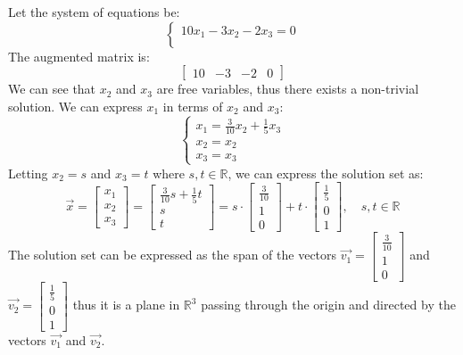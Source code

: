 \begin{eg}
    Let the system of equations be:
    \[
        \begin{cases}
            10x_1 - 3x_2 - 2x_3 = 0 \\
        \end{cases}
    \]
    The augmented matrix is:
    \[
        \begin{bmatrix}
            10 & -3 & -2 & 0
        \end{bmatrix}
    \]
    We can see that $x_2$ and $x_3$ are free variables, thus there exists a non-trivial solution. We can express $x_1$ in terms of $x_2$ and $x_3$:
    \[
        \begin{cases}
            x_1 = \frac{3}{10}x_2 + \frac{1}{5}x_3 \\
            x_2 = x_2 \\
            x_3 = x_3
        \end{cases}
    \]
    Letting $x_2 = s$ and $x_3 = t$ where $s, t \in \mathbb{R}$, we can express the solution set as:
    \[
        \vec{x} = \begin{bmatrix} x_1 \\ x_2 \\ x_3 \end{bmatrix} = \begin{bmatrix} \frac{3}{10}s + \frac{1}{5}t \\ s \\ t \end{bmatrix} = s \cdot \begin{bmatrix} \frac{3}{10} \\ 1 \\ 0 \end{bmatrix} + t \cdot \begin{bmatrix} \frac{1}{5} \\ 0 \\ 1 \end{bmatrix}, \quad s, t \in \mathbb{R}
    \]
    The solution set can be expressed as the span of the vectors $\vec{v_1} = \begin{bmatrix} \frac{3}{10} \\ 1 \\ 0 \end{bmatrix}$ and $\vec{v_2} = \begin{bmatrix} \frac{1}{5} \\ 0 \\ 1 \end{bmatrix}$ thus it is a plane in $\mathbb{R}^3$ passing through the origin and directed by the vectors $\vec{v_1}$ and $\vec{v_2}$.
\end{eg}

